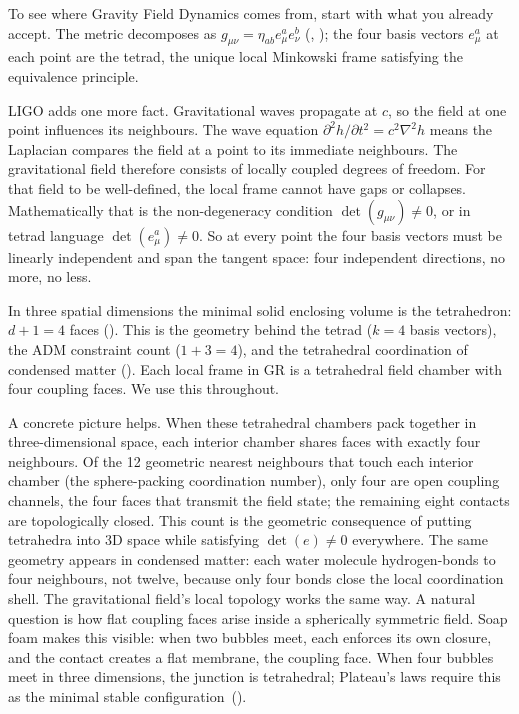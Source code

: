 \documentclass[aps,twocolumn,amsmath,amssymb,reprint,nofootinbib,nobalancelastpage]{revtex4-2}
\begin{document}
To see where Gravity Field Dynamics comes from, start with what you already accept. The metric decomposes as $g_{\mu\nu} = \eta_{ab} e^a_\mu e^b_\nu$ (\cite{mtw1973}, \cite{wald1984}); the four basis vectors $e^a_\mu$ at each point are the tetrad, the unique local Minkowski frame satisfying the equivalence principle.

LIGO adds one more fact. Gravitational waves propagate at $c$, so the field at one point influences its neighbours. The wave equation $\partial^2 h/\partial t^2 = c^2 \nabla^2 h$ means the Laplacian compares the field at a point to its immediate neighbours. The gravitational field therefore consists of locally coupled degrees of freedom. For that field to be well-defined, the local frame cannot have gaps or collapses. Mathematically that is the non-degeneracy condition $\det(g_{\mu\nu}) \neq 0$, or in tetrad language $\det(e^a_\mu) \neq 0$. So at every point the four basis vectors must be linearly independent and span the tangent space: four independent directions, no more, no less.

In three spatial dimensions the minimal solid enclosing volume is the tetrahedron: $d+1=4$ faces (\cite{ziegler1995}). This is the geometry behind the tetrad ($k=4$ basis vectors), the ADM constraint count ($1+3=4$), and the tetrahedral coordination of condensed matter (\cite{barbieri1998}). Each local frame in GR is a tetrahedral field chamber with four coupling faces. We use this throughout.

A concrete picture helps. When these tetrahedral chambers pack together in three-dimensional space, each interior chamber shares faces with exactly four neighbours. Of the 12 geometric nearest neighbours that touch each interior chamber (the sphere-packing coordination number), only four are open coupling channels, the four faces that transmit the field state; the remaining eight contacts are topologically closed. This count is the geometric consequence of putting tetrahedra into 3D space while satisfying $\det(e)\neq 0$ everywhere. The same geometry appears in condensed matter: each water molecule hydrogen-bonds to four neighbours, not twelve, because only four bonds close the local coordination shell. The gravitational field's local topology works the same way. A natural question is how flat coupling faces arise inside a spherically symmetric field. Soap foam makes this visible: when two bubbles meet, each enforces its own closure, and the contact creates a flat membrane, the coupling face. When four bubbles meet in three dimensions, the junction is tetrahedral; Plateau's laws require this as the minimal stable configuration~(\cite{taylor1976}).
\end{document}
